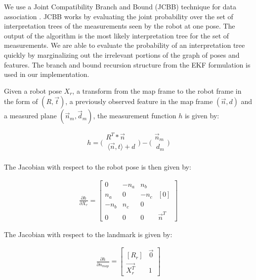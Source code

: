 \documentclass{tADR2e}
\begin{document}
We use a Joint Compatibility Branch and Bound (JCBB) technique for data association \cite{neira2001data}. JCBB works by evaluating the joint
probability over the set of interpretation trees of the measurements seen by the robot
at one pose. The output of the algorithm is the most likely interpretation tree for
the set of measurements. We are able to evaluate the probability of an interpretation
tree quickly by marginalizing out the irrelevant portions of the graph of poses and features. The branch and bound recursion structure from the EKF formulation is
used in our implementation.

Given a robot pose $X_r$, a transform from the map frame to the robot frame in the form of $(R, \vec{t})$, a previously
observed feature in the map frame $(\vec{n}, d)$ and a measured plane $(\vec{n}_m , \vec{d}_m )$, the measurement function $h$ is given by:

\begin{equation}
h=\bigg(
\begin{array}{c}
R^T*\vec{n}\\
\ \langle \vec{n},t\rangle + d \\
\end{array}
\bigg) -
\bigg(
\begin{array}{c}
\vec{n}_m\\
\ d_m\\
\end{array}
\bigg)
\end{equation}

The Jacobian with respect to the robot pose is then given by:

\begin{align}
\frac{\partial h}{\partial X_r}
 =
\begin{bmatrix} 
 0 & -n_a & n_b\\
 n_a & 0 & -n_c & [0]\\
 -n_b & n_c & 0\\
 0 & 0 & 0 & \vec{n}^T
\end{bmatrix}
\end{align}

The Jacobian with respect to the landmark is given by:

\begin{align}
\frac{\partial h}{\partial n_{map}}
 =
\begin{bmatrix} 
 [R_r] & \vec{0}\\
 \vec{X_r^T} & 1
\end{bmatrix}
\end{align}
\end{document}
